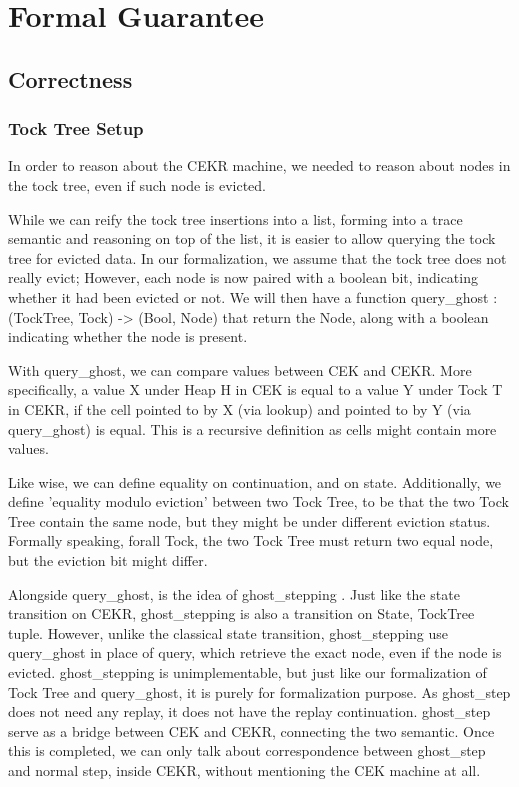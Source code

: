 \section{Formal Guarantee}
\subsection{Correctness}
\subsubsection{Tock Tree Setup}
In order to reason about the CEKR machine, we needed to reason about nodes in the tock tree, even if such node is evicted.

While we can reify the tock tree insertions into a list, forming into a trace semantic and reasoning on top of the list, it is easier to allow querying the tock tree for evicted data. In our formalization, we assume that the tock tree does not really evict; However, each node is now paired with a boolean bit, indicating whether it had been evicted or not. We will then have a function query\_ghost : (TockTree, Tock) -> (Bool, Node) that return the Node, along with a boolean indicating whether the node is present.

With query\_ghost, we can compare values between CEK and CEKR. More specifically, a value X under Heap H in CEK is equal to a value Y under Tock T in CEKR, if the cell pointed to by X (via lookup) and pointed to by Y (via query\_ghost) is equal. This is a recursive definition as cells might contain more values.

Like wise, we can define equality on continuation, and on state. Additionally, we define 'equality modulo eviction' between two Tock Tree, to be that the two Tock Tree contain the same node, but they might be under different eviction status. Formally speaking, forall Tock, the two Tock Tree must return two equal node, but the eviction bit might differ.

Alongside query\_ghost, is the idea of ghost\_stepping . Just like the state transition on CEKR, ghost\_stepping is also a transition on State, TockTree tuple. However, unlike the classical state transition, ghost\_stepping use query\_ghost in place of query, which retrieve the exact node, even if the node is evicted. ghost\_stepping is unimplementable, but just like our formalization of Tock Tree and query\_ghost, it is purely for formalization purpose. As ghost\_step does not need any replay, it does not have the replay continuation. ghost\_step serve as a bridge between CEK and CEKR, connecting the two semantic. Once this is completed, we can only talk about correspondence between ghost\_step and normal step, inside CEKR, without mentioning the CEK machine at all.

